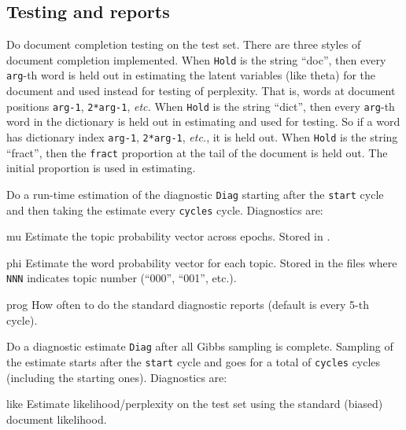 \documentclass[a4paper,english]{article}
\begin{document}
\subsection{Testing and reports}
\begin{Description}\setlength{\itemsep}{0cm}
\item[\OptArg{-h}{Hold,arg}] 
Do document completion testing on the test set.
There are three styles of document completion implemented.
When \texttt{Hold} is the string ``doc'', then every \texttt{arg}-th
word is held out in estimating the latent variables (like theta)
for the document and used instead for testing of perplexity.
That is, words at document positions \texttt{arg-1}, \texttt{2*arg-1}, 
\emph{etc.}
When \texttt{Hold} is the string ``dict'', then every \texttt{arg}-th
word in the dictionary is held out in estimating
and used for testing.  So if a word has dictionary index 
\texttt{arg-1}, \texttt{2*arg-1}, \emph{etc.}, it is held out.
When \texttt{Hold} is the string ``fract'',
then the \texttt{fract}
proportion at the tail of the document is held out.  
The initial proportion is used in estimating.
\item[\OptArg{-l}{Diag,cycles,start}] 
Do a run-time estimation of the diagnostic \texttt{Diag}
starting after the \texttt{start} cycle and then taking the
estimate every \texttt{cycles} cycle.
Diagnostics are:
\begin{Description}[testprob]\setlength{\itemsep}{0cm}
\item[mu] 
Estimate the topic probability vector across epochs.
Stored in .
\item[phi] 
Estimate the word probability vector for each topic.
Stored in the  files where
\texttt{NNN} indicates topic number (``000'', ``001'', etc.).
\item[prog] 
How often to do the standard diagnostic reports
(default is every 5-th cycle).
\end{Description}
\item[\OptArg{-L}{Diag,cycles,start}] 
Do a diagnostic estimate \texttt{Diag} after
all Gibbs sampling is complete.
Sampling of the estimate starts after the \texttt{start} cycle 
and goes for a total of \texttt{cycles} cycles
(including the starting ones).
Diagnostics are:
\begin{Description}[class]\setlength{\itemsep}{0cm}
\item[like] 
Estimate likelihood/perplexity on the test set
using the standard (biased) document likelihood.

\end{Description}
\end{Description}
\end{document}
